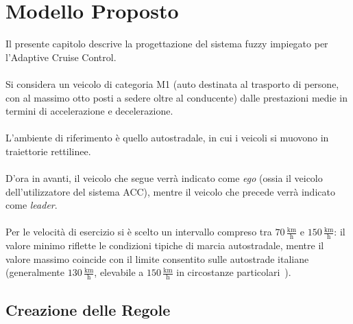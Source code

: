 \chapter{Modello Proposto}

Il presente capitolo descrive la progettazione del sistema fuzzy impiegato per l'Adaptive Cruise Control.  
\\\\
Si considera un veicolo di categoria M1 (auto destinata al trasporto di persone, con al massimo otto posti a sedere oltre al conducente)
dalle prestazioni medie in termini di accelerazione e decelerazione.  
\\\\
L'ambiente di riferimento è quello autostradale, in cui i veicoli si muovono in traiettorie rettilinee.  
\\\\
D'ora in avanti, il veicolo che segue verrà indicato come \emph{ego} (ossia il veicolo dell'utilizzatore del sistema ACC), 
mentre il veicolo che precede verrà indicato come \emph{leader}.  
\\\\
Per le velocità di esercizio si è scelto un intervallo compreso tra \(70\,\text{$\frac{\mathrm{km}}{\mathrm{h}}$}\) e \(150\,\text{$\frac{\mathrm{km}}{\mathrm{h}}$}\): 
il valore minimo riflette le condizioni tipiche di marcia autostradale, mentre il valore massimo coincide con il limite consentito 
sulle autostrade italiane (generalmente \(130\,\text{$\frac{\mathrm{km}}{\mathrm{h}}$}\), elevabile a \(150\,\text{$\frac{\mathrm{km}}{\mathrm{h}}$}\) in circostanze particolari~\cite{limite_autostrada_150}).  
 



\section{Creazione delle Regole}